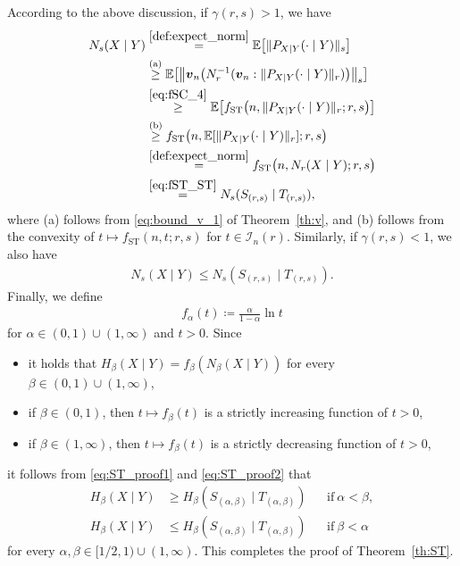 \documentclass[conference, draftcls, onecolumn]{IEEEtran}
\theoremstyle{plain}
\newcommand{\bvec}[1]{\boldsymbol{#1}}
\newcommand{\thref}[1]{Theorem~\ref{#1}}
\begin{document}
\begin{IEEEproof}[Proof of \thref{th:ST}]
According to the above discussion, if $\gamma( r, s ) > 1$, we have
\begin{align}
N_{s}(X \mid Y)
& \overset{\eqref{def:expect_norm}}{=}
\mathbb{E}\big[ \| P_{X|Y}(\cdot \mid Y) \|_{s} \big]
\\
& \overset{\text{(a)}}{\ge}
\mathbb{E}\big[ \big\| \bvec{v}_{n}\big( N_{r}^{-1}(\bvec{v}_{n} : \| P_{X|Y}(\cdot \mid Y) \|_{r} ) \big) \big\|_{s} \big]
\\
& \overset{\eqref{eq:fSC_4}}{\ge}
\mathbb{E}\big[ f_{\mathrm{ST}} \big( n, \| P_{X|Y}(\cdot \mid Y) \|_{r}; r, s \big) \big]
\\
& \overset{\text{(b)}}{\ge}
f_{\mathrm{ST}} \big( n, \mathbb{E}[ \| P_{X|Y}(\cdot \mid Y) \|_{r} ]; r, s \big)
\\
& \overset{\eqref{def:expect_norm}}{=}
f_{\mathrm{ST}} \big( n, N_{r}(X \mid Y); r, s \big)
\\
& \overset{\eqref{eq:fST_ST}}{=}
N_{s}(S_{(r, s)} \mid T_{(r, s)}) ,
\label{eq:ST_proof1}
\end{align}
where (a) follows from \eqref{eq:bound_v_1} of \thref{th:v}, and (b) follows from the convexity of $t \mapsto f_{\mathrm{ST}}( n, t; r, s )$ for $t \in \mathcal{I}_{n}( r )$.
Similarly, if $\gamma( r, s ) < 1$, we also have
\begin{align}
N_{s}(X \mid Y)
\le
N_{s}(S_{(r, s)} \mid T_{(r, s)}) .
\label{eq:ST_proof2}
\end{align}
Finally, we define
\begin{align}
f_{\alpha}( t )
\coloneqq
\frac{ \alpha }{ 1 - \alpha } \ln t
\end{align}
for $\alpha \in (0, 1) \cup (1, \infty)$ and $t > 0$.
Since
\begin{itemize}
\item
it holds that $H_{\beta}(X \mid Y) = f_{\beta}( N_{\beta}(X \mid Y) )$ for every $\beta \in (0, 1) \cup (1, \infty)$,
\item
if $\beta \in (0, 1)$, then $t \mapsto f_{\beta}( t )$ is a strictly increasing function of $t > 0$,
\item
if $\beta \in (1, \infty)$, then $t \mapsto f_{\beta}( t )$ is a strictly decreasing function of $t > 0$,
\end{itemize}
it follows from \eqref{eq:ST_proof1} and \eqref{eq:ST_proof2} that
\begin{align}
H_{\beta}(X \mid Y)
& \ge
H_{\beta}(S_{(\alpha, \beta)} \mid T_{(\alpha, \beta)})
&& \mathrm{if} \ \alpha < \beta ,
\\
H_{\beta}(X \mid Y)
& \le
H_{\beta}(S_{(\alpha, \beta)} \mid T_{(\alpha, \beta)})
&& \mathrm{if} \ \beta < \alpha
\end{align}
for every $\alpha, \beta \in [1/2, 1) \cup (1, \infty)$.
This completes the proof of \thref{th:ST}.
\end{IEEEproof}
\end{document}
